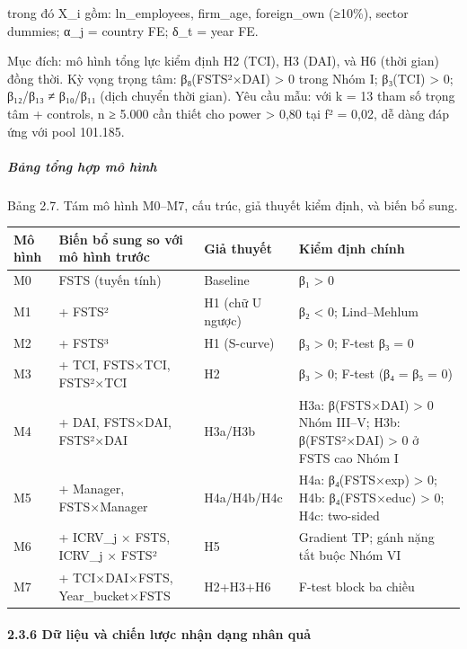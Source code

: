 \documentclass[12pt,a4paper]{article}
\begin{document}
trong đó X\_i gồm: ln\_employees, firm\_age, foreign\_own (≥10\%),
sector dummies; α\_j = country FE; δ\_t = year FE.

Mục đích: mô hình tổng lực kiểm định H2 (TCI), H3 (DAI), và H6 (thời
gian) đồng thời. Kỳ vọng trọng tâm: β₈(FSTS²×DAI) \textgreater{} 0 trong
Nhóm I; β₃(TCI) \textgreater{} 0; β₁₂/β₁₃ ≠ β₁₀/β₁₁ (dịch chuyển thời
gian). Yêu cầu mẫu: với k = 13 tham số trọng tâm + controls, n ≥ 5.000
cần thiết cho power \textgreater{} 0,80 tại f² = 0,02, dễ dàng đáp ứng
với pool 101.185.

\hypertarget{bux1ea3ng-tux1ed5ng-hux1ee3p-muxf4-huxecnh}{%
\subparagraph{Bảng tổng hợp mô
hình}\label{bux1ea3ng-tux1ed5ng-hux1ee3p-muxf4-huxecnh}}

Bảng 2.7. Tám mô hình M0--M7, cấu trúc, giả thuyết kiểm định, và biến bổ
sung.

\begin{longtable}[]{@{}llll@{}}
\toprule\noalign{}
Mô hình & Biến bổ sung so với mô hình trước & Giả thuyết & Kiểm định
chính \\
\midrule\noalign{}
\endhead
\bottomrule\noalign{}
\endlastfoot
M0 & FSTS (tuyến tính) & Baseline & β₁ \textgreater{} 0 \\
M1 & + FSTS² & H1 (chữ U ngược) & β₂ \textless{} 0; Lind--Mehlum \\
M2 & + FSTS³ & H1 (S-curve) & β₃ \textgreater{} 0; F-test β₃ = 0 \\
M3 & + TCI, FSTS×TCI, FSTS²×TCI & H2 & β₃ \textgreater{} 0; F-test (β₄ =
β₅ = 0) \\
M4 & + DAI, FSTS×DAI, FSTS²×DAI & H3a/H3b & H3a: β(FSTS×DAI)
\textgreater{} 0 Nhóm III--V; H3b: β(FSTS²×DAI) \textgreater{} 0 ở FSTS
cao Nhóm I \\
M5 & + Manager, FSTS×Manager & H4a/H4b/H4c & H4a: β₄(FSTS×exp)
\textgreater{} 0; H4b: β₄(FSTS×educ) \textgreater{} 0; H4c: two-sided \\
M6 & + ICRV\_j × FSTS, ICRV\_j × FSTS² & H5 & Gradient TP; gánh nặng tắt
buộc Nhóm VI \\
M7 & + TCI×DAI×FSTS, Year\_bucket×FSTS & H2+H3+H6 & F-test block ba
chiều \\
\end{longtable}

\hypertarget{236-dux1eef-liux1ec7u-vuxe0-chiux1ebfn-lux1b0ux1ee3c-nhux1eadn-dux1ea1ng-nhuxe2n-quux1ea3}{%
\paragraph{2.3.6 Dữ liệu và chiến lược nhận dạng nhân
quả}\label{236-dux1eef-liux1ec7u-vuxe0-chiux1ebfn-lux1b0ux1ee3c-nhux1eadn-dux1ea1ng-nhuxe2n-quux1ea3}}
\end{document}

